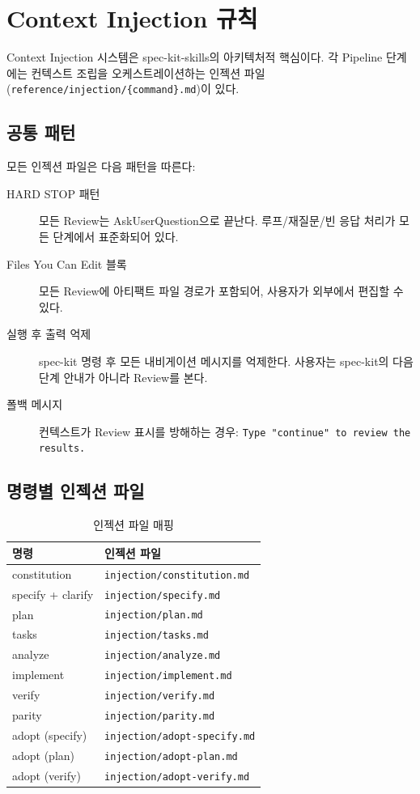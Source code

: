 \documentclass[11pt,a4paper,openright,twoside]{report}
\newcommand{\file}[1]{\texttt{#1}}
\begin{document}
\section{Context Injection 규칙}

Context Injection 시스템은 spec-kit-skills의 아키텍처적 핵심이다. 각 Pipeline 단계에는 컨텍스트 조립을 오케스트레이션하는 인젝션 파일(\file{reference/injection/\{command\}.md})이 있다.

\subsection{공통 패턴}

모든 인젝션 파일은 다음 패턴을 따른다:

\begin{description}
  \item[HARD STOP 패턴] 모든 Review는 AskUserQuestion으로 끝난다. 루프/재질문/빈 응답 처리가 모든 단계에서 표준화되어 있다.
  \item[Files You Can Edit 블록] 모든 Review에 아티팩트 파일 경로가 포함되어, 사용자가 외부에서 편집할 수 있다.
  \item[실행 후 출력 억제] spec-kit 명령 후 모든 내비게이션 메시지를 억제한다. 사용자는 spec-kit의 다음 단계 안내가 아니라 Review를 본다.
  \item[폴백 메시지] 컨텍스트가 Review 표시를 방해하는 경우: \texttt{Type "continue" to review the results.}
\end{description}

\subsection{명령별 인젝션 파일}

\begin{table}[H]
\centering
\caption{인젝션 파일 매핑}
\label{tab:injection-files}
\begin{tabularx}{\textwidth}{lX}
\toprule
\textbf{명령} & \textbf{인젝션 파일} \\
\midrule
constitution & \file{injection/constitution.md} \\
specify + clarify & \file{injection/specify.md} \\
plan & \file{injection/plan.md} \\
tasks & \file{injection/tasks.md} \\
analyze & \file{injection/analyze.md} \\
implement & \file{injection/implement.md} \\
verify & \file{injection/verify.md} \\
parity & \file{injection/parity.md} \\
adopt (specify) & \file{injection/adopt-specify.md} \\
adopt (plan) & \file{injection/adopt-plan.md} \\
adopt (verify) & \file{injection/adopt-verify.md} \\
\bottomrule
\end{tabularx}
\end{table}
\end{document}
